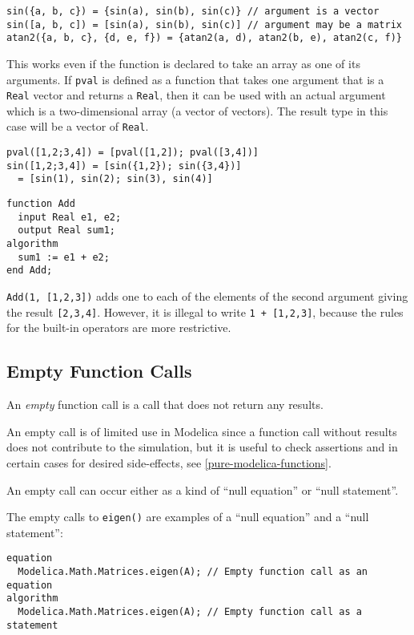 \begin{example}
\begin{lstlisting}[language=modelica]
sin({a, b, c}) = {sin(a), sin(b), sin(c)} // argument is a vector
sin([a, b, c]) = [sin(a), sin(b), sin(c)] // argument may be a matrix
atan2({a, b, c}, {d, e, f}) = {atan2(a, d), atan2(b, e), atan2(c, f)}
\end{lstlisting}
This works even if the function is declared to take an array as
one of its arguments. If \lstinline!pval! is defined as a function that takes
one argument that is a \lstinline!Real! vector and returns a \lstinline!Real!, then it can
be used with an actual argument which is a two-dimensional array (a
vector of vectors). The result type in this case will be a vector of
\lstinline!Real!.
\begin{lstlisting}[language=modelica]
pval([1,2;3,4]) = [pval([1,2]); pval([3,4])]
sin([1,2;3,4]) = [sin({1,2}); sin({3,4})]
  = [sin(1), sin(2); sin(3), sin(4)]
\end{lstlisting}
\begin{lstlisting}[language=modelica]
function Add
  input Real e1, e2;
  output Real sum1;
algorithm
  sum1 := e1 + e2;
end Add;
\end{lstlisting}
\lstinline!Add(1, [1,2,3])! adds one to each of the elements of the second
argument giving the result \lstinline![2,3,4]!. However, it is illegal to
write \lstinline!1 + [1,2,3]!, because the rules for the built-in
operators are more restrictive.
\end{example}

\subsection{Empty Function Calls}\label{empty-function-calls}

An \emph{empty} function call is a call that does not return any results.

\begin{nonnormative}
An empty call is of limited use in Modelica since a function call without results does not contribute to the simulation,
but it is useful to check assertions and in certain cases for desired side-effects, see \cref{pure-modelica-functions}.
\end{nonnormative}

An empty call can occur either as a kind of ``null equation'' or ``null statement''.

\begin{example}
The empty calls to \lstinline!eigen()! are examples of a ``null equation'' and a ``null statement'':
\begin{lstlisting}[language=modelica]
equation
  Modelica.Math.Matrices.eigen(A); // Empty function call as an equation
algorithm
  Modelica.Math.Matrices.eigen(A); // Empty function call as a statement
\end{lstlisting}
\end{example}

